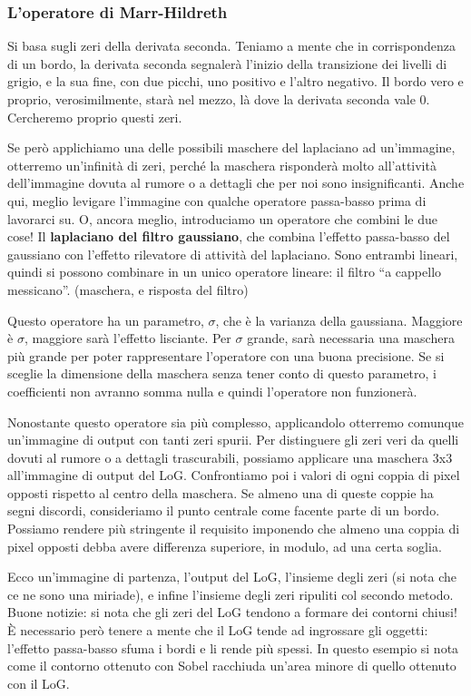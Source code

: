 \documentclass[a4paper,11pt]{article}
\begin{document}
\subsubsection{L'operatore di Marr-Hildreth}
Si basa sugli zeri della derivata seconda. Teniamo a mente che in corrispondenza di un bordo, la derivata seconda segnalerà l'inizio della transizione
dei livelli di grigio, e la sua fine, con due picchi, uno positivo e l'altro negativo. Il bordo vero e proprio, verosimilmente, starà nel mezzo,
là dove la derivata seconda vale 0. Cercheremo proprio questi zeri.
\par
Se però applichiamo una delle possibili maschere del laplaciano ad un'immagine, otterremo un'infinità di zeri, perché la maschera risponderà
molto all'attività dell'immagine dovuta al rumore o a dettagli che per noi sono insignificanti. Anche qui, meglio levigare l'immagine con qualche
operatore passa-basso prima di lavorarci su. O, ancora meglio, introduciamo un operatore che combini le due cose! Il \textbf{laplaciano del filtro gaussiano},
che combina l'effetto passa-basso del gaussiano con l'effetto rilevatore di attività del laplaciano. Sono entrambi lineari, quindi si possono combinare in un unico
operatore lineare: il filtro ``a cappello messicano''.
(maschera, e risposta del filtro)
\par
Questo operatore ha un parametro, $\sigma$, che è la varianza della gaussiana. Maggiore è $\sigma$, maggiore sarà l'effetto lisciante. Per $\sigma$
grande, sarà necessaria una maschera più grande per poter rappresentare l'operatore con una buona precisione. Se si sceglie la dimensione della maschera
senza tener conto di questo parametro, i coefficienti non avranno somma nulla e quindi l'operatore non funzionerà.
\par
Nonostante questo operatore sia più complesso, applicandolo otterremo comunque un'immagine di output con tanti zeri spurii. Per distinguere gli zeri
veri da quelli dovuti al rumore o a dettagli trascurabili, possiamo applicare una maschera 3x3 all'immagine di output del LoG. Confrontiamo poi i valori
di ogni coppia di pixel opposti rispetto al centro della maschera. Se almeno una di queste coppie ha segni discordi, consideriamo il punto centrale
come facente parte di un bordo. Possiamo rendere più stringente il requisito imponendo che almeno una coppia di pixel opposti debba avere
differenza superiore, in modulo, ad una certa soglia.
\par
Ecco un'immagine di partenza, l'output del LoG, l'insieme degli zeri (si nota che ce ne sono una miriade), e infine l'insieme degli zeri ripuliti col secondo metodo.
Buone notizie: si nota che gli zeri del LoG tendono a formare dei contorni chiusi! È necessario però tenere a mente che il LoG tende ad ingrossare gli oggetti:
l'effetto passa-basso sfuma i bordi e li rende più spessi. In questo esempio si nota come il contorno ottenuto con Sobel racchiuda un'area minore di quello
ottenuto con il LoG.
\end{document}
